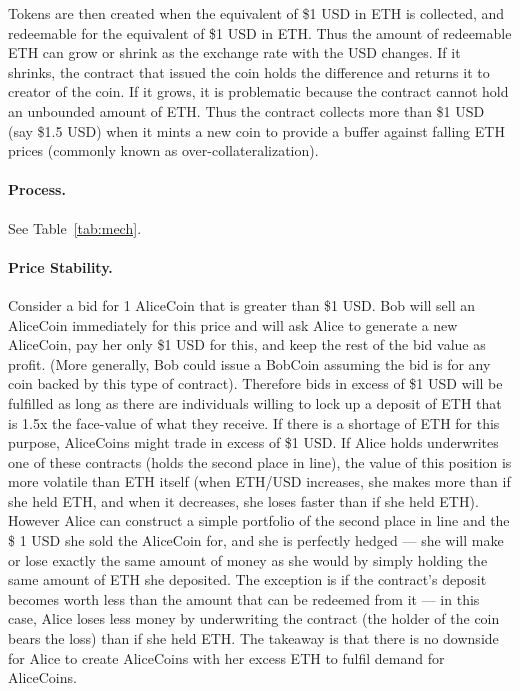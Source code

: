 Tokens are then created when the equivalent of \$1 USD in ETH is collected, and redeemable for the equivalent of \$1 USD in ETH. Thus the amount of redeemable ETH can grow or shrink as the exchange rate with the USD changes. If it shrinks, the contract that issued the coin holds the difference and returns it to creator of the coin. If it grows, it is problematic because the contract cannot hold an unbounded amount of ETH. Thus the contract collects more than \$1 USD (say \$1.5 USD) when it mints a new coin to provide a buffer against falling ETH prices (commonly known as over-collateralization).

\paragraph{Process.} See Table~\ref{tab:mech}.

\paragraph{Price Stability.} Consider a bid for 1 AliceCoin that is greater than \$1 USD. Bob will sell an AliceCoin immediately for this price and will ask Alice to generate a new AliceCoin, pay her only \$1 USD for this, and keep the rest of the bid value as profit. (More generally, Bob could issue a BobCoin assuming the bid is for any coin backed by this type of contract). Therefore bids in excess of \$1 USD will be fulfilled as long as there are individuals willing to lock up a deposit of ETH that is 1.5x the face-value of what they receive. If there is a shortage of ETH for this purpose, AliceCoins might trade in excess of \$1 USD. If Alice holds underwrites one of these contracts (\ie holds the second place in line), the value of this position is more volatile than ETH itself (when ETH/USD increases, she makes more than if she held ETH, and when it decreases, she loses faster than if she held ETH). However Alice can construct a simple portfolio of the second place in line and the \$ 1 USD she sold the AliceCoin for, and she is perfectly hedged --- she will make or lose exactly the same amount of money as she would by simply holding the same amount of ETH she deposited. The exception is if the contract's deposit becomes worth less than the amount that can be redeemed from it --- in this case, Alice loses less money by underwriting the contract (the holder of the coin bears the loss) than if she held ETH. The takeaway is that there is no downside for Alice to create AliceCoins with her excess ETH to fulfil demand for AliceCoins. 

